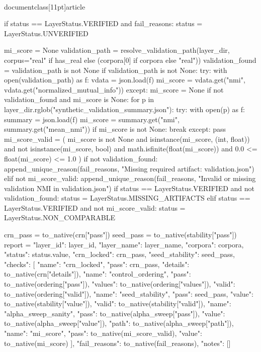 \\documentclass[11pt]{article}
\begin{document}
\begin{CodeBlock}
    if status == LayerStatus.VERIFIED and fail_reasons: status = LayerStatus.UNVERIFIED
        
    mi_score = None
    validation_path = resolve_validation_path(layer_dir, corpus="real" if has_real else (corpora[0] if corpora else "real"))
    validation_found = validation_path is not None
    if validation_path is not None:
        try:
            with open(validation_path) as f:
                vdata = json.load(f)
                mi_score = vdata.get("nmi", vdata.get("normalized_mutual_info"))
        except:
            mi_score = None
    if not validation_found and mi_score is None:
        for p in layer_dir.rglob("synthetic_validation_summary.json"):
            try:
                with open(p) as f:
                    summary = json.load(f)
                    mi_score = summary.get("nmi", summary.get("mean_nmi"))
                    if mi_score is not None: break
            except: pass
    mi_score_valid = (
        mi_score is not None
        and isinstance(mi_score, (int, float))
        and not isinstance(mi_score, bool)
        and math.isfinite(float(mi_score))
        and 0.0 <= float(mi_score) <= 1.0
    )
    if not validation_found:
        append_unique_reason(fail_reasons, "Missing required artifact: validation.json")
    elif not mi_score_valid:
        append_unique_reason(fail_reasons, "Invalid or missing validation NMI in validation.json")
    if status == LayerStatus.VERIFIED and not validation_found:
        status = LayerStatus.MISSING_ARTIFACTS
    elif status == LayerStatus.VERIFIED and not mi_score_valid:
        status = LayerStatus.NON_COMPARABLE

    crn_pass = to_native(crn["pass"])
    seed_pass = to_native(stability["pass"])
    report = {
        "layer_id": layer_id, "layer_name": layer_name, "corpora": corpora, "status": status.value,
        "crn_locked": crn_pass,
        "seed_stability": seed_pass,
        "checks": [
            {"name": "crn_locked", "pass": crn_pass, "details": to_native(crn["details"])},
            {"name": "control_ordering", "pass": to_native(ordering["pass"]), "values": to_native(ordering["values"]), "valid": to_native(ordering["valid"])},
            {"name": "seed_stability", "pass": seed_pass, "value": to_native(stability["value"]), "valid": to_native(stability["valid"])},
            {"name": "alpha_sweep_sanity", "pass": to_native(alpha_sweep["pass"]), "value": to_native(alpha_sweep["value"]), "path": to_native(alpha_sweep["path"])},
            {"name": "mi_score", "pass": to_native(mi_score_valid), "value": to_native(mi_score)}
        ],
        "fail_reasons": to_native(fail_reasons), "notes": []
    }
    

\end{CodeBlock}
\end{document}

